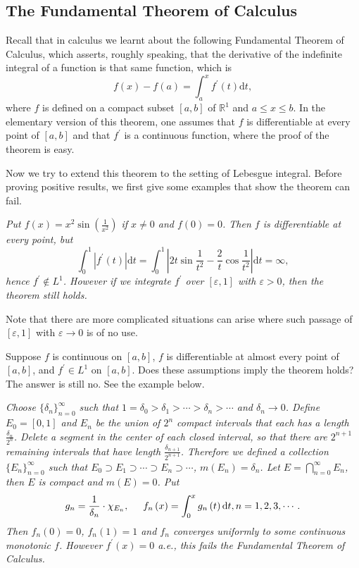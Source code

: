 \subsection{The Fundamental Theorem of Calculus}
Recall that in calculus we learnt about the following Fundamental Theorem of Calculus, which asserts, roughly speaking, that the derivative of the indefinite integral of a function is that same function, which is 
$$
f\left( x \right) -f\left( a \right) =\int_a^x{f^{\prime}\left( t \right) \mathrm{d}t},
$$
where $f$ is defined on a compact subset $[a,b]$ of $\mathbb{R}^1$ and $a\le x\le b$. In the elementary version of this theorem, one assumes that $f$ is differentiable at every point of $[a,b]$ and that $f^\prime$ is a continuous function, where the proof of the theorem is easy.\par
Now we try to extend this theorem to the setting of Lebesgue integral. Before proving positive results, we first give some examples that show the theorem can fail.\par
\begin{example}\em
Put $f(x)=x^2\sin\left(\frac{1}{x^2}\right)$ if $x\ne 0$ and $f(0)=0$. Then $f$ is differentiable at every point, but 
$$
\int_0^1{\left| f^{\prime}\left( t \right) \right|\mathrm{d}t}=\int_0^1{\left| 2t\sin \frac{1}{t^2}-\frac{2}{t}\cos \frac{1}{t^2} \right|\mathrm{d}t}=\infty ,
$$
hence $f^\prime\notin L^1$. However if we integrate $f^\prime$ over $[\varepsilon,1]$ with $\varepsilon>0$, then the theorem still holds.
\end{example}
Note that there are more complicated situations can arise where such passage of $[\varepsilon,1]$ with $\varepsilon\to 0$ is of no use.\par
Suppose $f$ is continuous on $[a,b]$, $f$ is differentiable at almost every point of $[a,b]$, and $f^\prime\in L^1$ on $[a,b]$. Does these assumptions imply the theorem holds? The answer is still no. See the example below.
\begin{example}\em
Choose $\{\delta_n\}_{n=0}^\infty$ such that $1=\delta_0>\delta_1>\cdots>\delta_n>\cdots$ and $\delta_n\to 0$. Define $E_0=[0,1]$ and $E_n$ be the union of $2^n$ compact intervals that each has a length $\frac{\delta_n}{2^n}$. Delete a segment in the center of each closed interval, so that there are $2^{n+1}$ remaining intervals that have length $\frac{\delta_{n+1}}{2^{n+1}}$. Therefore we defined a collection $\{E_n\}_{n=0}^\infty$ such that $E_0\supset E_1\supset\cdots\supset E_n\supset\cdots$, $m(E_n)=\delta_n$. Let $E=\bigcap_{n=0}^\infty E_n$, then $E$ is compact and $m(E)=0$. Put 
$$
g_n=\frac{1}{\delta _n}\cdot \chi _{E_n},\hspace{0.5cm}f_n\left( x \right) =\int_0^x{g_n\left( t \right) \mathrm{d}t},n=1,2,3,\cdots .
$$
Then $f_n(0)=0$, $f_n(1)=1$ and $f_n$ converges uniformly to some continuous monotonic $f$. However $f^\prime(x)=0$ a.e., this fails the Fundamental Theorem of Calculus.
\end{example}
